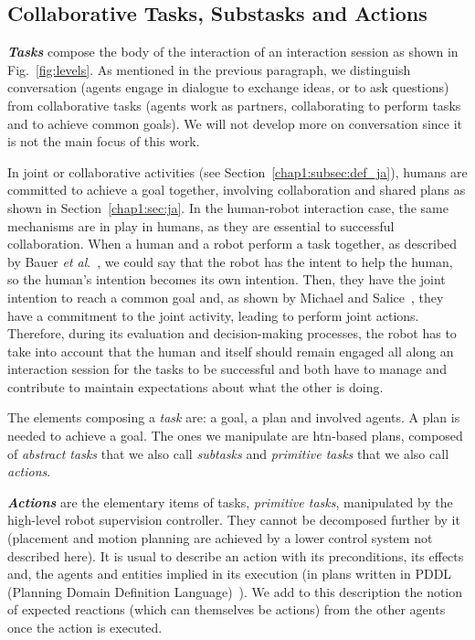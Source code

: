 \documentclass[a4paper,11pt,twoside]{StyleThese}
\begin{document}
\subsection{Collaborative Tasks, Substasks and Actions}
\textbf{\textit{Tasks}} compose the body of the interaction of an interaction session as shown in Fig.~\ref{fig:levels}. As mentioned in the previous paragraph, we distinguish conversation (\ie agents engage in dialogue to exchange ideas, or to ask questions) from collaborative tasks (\ie agents work as partners, collaborating to perform tasks and to achieve common goals). We will not develop more on conversation since it is not the main focus of this work.

In joint or collaborative activities (see Section~\ref{chap1:subsec:def_ja}), humans are committed to achieve a goal together, involving collaboration and shared plans as shown in Section~\ref{chap1:sec:ja}. In the human-robot interaction case, the same mechanisms are in play in humans, as they are essential to successful collaboration. When a human and a robot perform a task together, as described by Bauer \textit{et al}.~\cite{bauer_2008_collab}, we could say that the robot has the intent to help the human, so the human's intention becomes its own intention. Then, they have the joint intention to reach a common goal and, as shown by Michael and Salice~\cite{michael_2017_commitment}, they have a commitment to the joint activity, leading to perform joint actions. Therefore, during its evaluation and decision-making processes, the robot has to take into account that the human and itself should remain engaged all along an interaction session for the tasks to be successful and both have to manage and contribute to maintain expectations about what the other is doing. 

The elements composing a \textit{task} are: a goal, a plan and involved agents. A plan is needed to achieve a goal. The ones we manipulate are \acrshort{htn}-based plans, composed of \emph{abstract tasks} that we also call \emph{subtasks} and \emph{primitive tasks} that we also call \emph{actions}.

\textbf{\textit{Actions}} are the elementary items of tasks, \emph{primitive tasks}, manipulated by the high-level robot supervision controller. They cannot be decomposed further by it (\eg placement and motion planning are achieved by a lower control system not described here). It is usual to describe an action with its preconditions, its effects and, the agents and entities implied in its execution (\eg in plans written in PDDL (Planning Domain Definition Language)~\cite{ghallab_98_pddl}). We add to this description the notion of expected reactions (which can themselves be actions) from the other agents once the action is executed.
\end{document}

